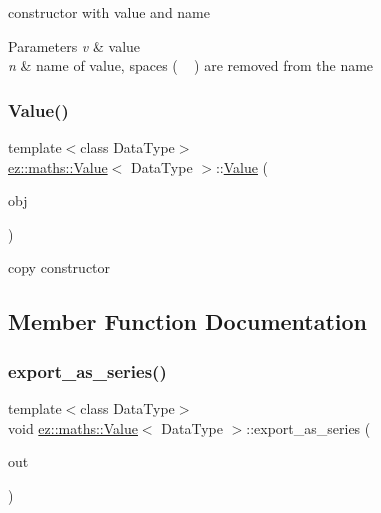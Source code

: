 constructor with value and name 
\begin{DoxyParams}{Parameters}
{\em v} & value \\
\hline
{\em n} & name of value, spaces (\textquotesingle{} \textquotesingle{}  ~\newline
) are removed from the name \\
\hline
\end{DoxyParams}
\mbox{\label{classez_1_1maths_1_1Value_a78b4d0d160978c3c6292e180e79b9662}} 
\subsubsection{\texorpdfstring{Value()}{Value()}\hspace{0.1cm}{\footnotesize\ttfamily [4/4]}}
{\footnotesize\ttfamily template$<$class Data\+Type$>$ \\
\hyperlink{classez_1_1maths_1_1Value}{ez\+::maths\+::\+Value}$<$ Data\+Type $>$\+::\hyperlink{classez_1_1maths_1_1Value}{Value} (\begin{DoxyParamCaption}\item[{const \hyperlink{classez_1_1maths_1_1Value}{Value}$<$ Data\+Type $>$ \&}]{obj }\end{DoxyParamCaption})\hspace{0.3cm}{\ttfamily [inline]}}

copy constructor 

\subsection{Member Function Documentation}
\mbox{\label{classez_1_1maths_1_1Value_a8e05fc26bd5bce27feecaa5131efa946}} 
\subsubsection{\texorpdfstring{export\+\_\+as\+\_\+series()}{export\_as\_series()}}
{\footnotesize\ttfamily template$<$class Data\+Type$>$ \\
void \hyperlink{classez_1_1maths_1_1Value}{ez\+::maths\+::\+Value}$<$ Data\+Type $>$\+::export\+\_\+as\+\_\+series (\begin{DoxyParamCaption}\item[{ostream \&}]{out }\end{DoxyParamCaption})\hspace{0.3cm}{\ttfamily [inline]}}

